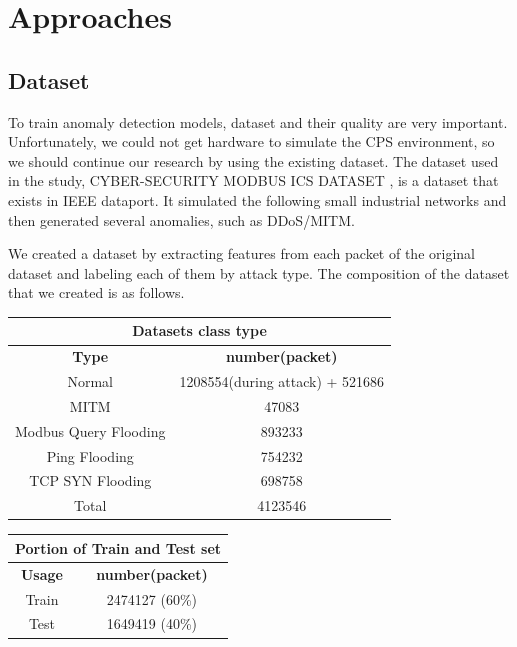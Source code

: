 \documentclass[fontsize=10pt]{article}
\begin{document}
\section{Approaches}
\subsection{Dataset}
To train anomaly detection models, dataset and their quality are very important. Unfortunately, we could not get hardware to simulate the CPS environment, so we should continue our research by using the existing dataset. The dataset used in the study, CYBER-SECURITY MODBUS ICS DATASET \cite{pjff-1a03-19}, is a dataset that exists in IEEE dataport. It simulated the following small industrial networks and then generated several anomalies, such as DDoS/MITM.


We created a dataset by extracting features from each packet of the original dataset and labeling each of them by attack type. The composition of the dataset that we created is as follows.
\begin{center}
    \begin{tabular}{|c|c|}
        \multicolumn{2}{c}{\textbf{\large Datasets class type}} \\ \hline
        \textbf{Type}                & \textbf{number(packet)}         \\ \hline
        Normal                       & 1208554(during attack) + 521686 \\ \hline
        MITM                         & 47083                           \\ \hline
        Modbus Query Flooding        & 893233                          \\ \hline
        Ping Flooding                & 754232                          \\ \hline
        TCP SYN Flooding             & 698758                          \\ \hline
        Total                        & 4123546                         \\ \hline
    \end{tabular}
\end{center}
\begin{center}
    \begin{tabular}{|c|c|}
        \multicolumn{2}{c}{\textbf{\large Portion of Train and Test set}} \\ \hline
        \textbf{Usage}              & \textbf{number(packet)}         \\ \hline
        Train                       & 2474127 (60\%)                      \\ \hline
        Test                        & 1649419 (40\%)                     \\ \hline
    \end{tabular}
\end{center}
\end{document}
